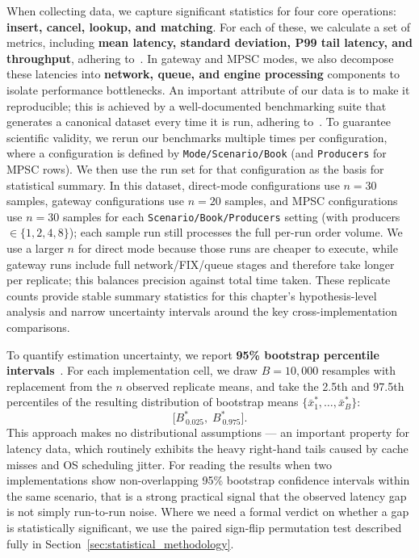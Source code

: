 When collecting data, we capture significant statistics for four core operations: 
\textbf{insert, cancel, lookup, and matching}. For each of these, we calculate 
a set of metrics, including \textbf{mean latency, standard deviation, 
P99 tail latency, and throughput}, adhering to~. In gateway and MPSC 
modes, we also decompose these latencies into \textbf{network, queue, and engine 
processing} components to isolate performance bottlenecks. An important 
attribute of our data is to make it reproducible; this is achieved by a 
well-documented benchmarking suite that generates a canonical dataset every time 
it is run, adhering to~. To guarantee scientific validity, we rerun our 
benchmarks multiple times per configuration, where a configuration is defined
by \texttt{Mode/Scenario/Book} (and \texttt{Producers} for MPSC rows). We then
use the run set for that configuration as the basis for statistical
summary. In this dataset, direct-mode configurations use $n=30$
samples, gateway configurations use $n=20$ samples, and MPSC
configurations use $n=30$ samples for each
\texttt{Scenario/Book/Producers} setting (with producers $\in\{1,2,4,8\}$);
each sample run still processes the full per-run order volume.
We use a larger $n$ for direct mode because those runs are cheaper to execute,
while gateway runs include full network/FIX/queue stages and therefore take
longer per replicate; this balances precision against total time taken.
These replicate counts provide stable summary statistics for this chapter's
hypothesis-level analysis and narrow uncertainty intervals around the key
cross-implementation comparisons.

To quantify estimation uncertainty, we report \textbf{95\% bootstrap percentile
intervals}~\citep{efron1994introduction}. For each implementation cell, we draw
$B = 10{,}000$ resamples with replacement from the $n$ observed replicate means,
and take the 2.5th and 97.5th percentiles of the resulting distribution of
bootstrap means $\{\bar{x}_1^*, \ldots, \bar{x}_B^*\}$:
\[
  \bigl[B_{\,0.025}^{*},\; B_{\,0.975}^{*}\bigr].
\]
This approach makes no distributional assumptions — an important property for
latency data, which routinely exhibits the heavy right-hand tails caused by
cache misses and OS scheduling jitter. For reading the results when two
implementations show non-overlapping 95\% bootstrap confidence intervals
within the same scenario, that is a strong practical signal that the 
observed latency gap is not simply run-to-run noise. Where we need a 
formal verdict on whether a gap
is statistically significant, we use the paired sign-flip permutation test
described fully in Section~\ref{sec:statistical_methodology}.

